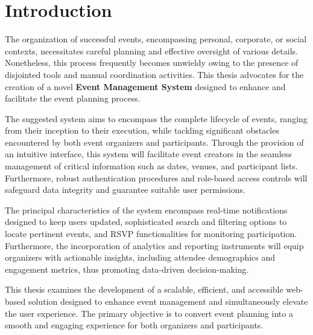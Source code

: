 \chapter{Introduction}
\label{ch:intro}

The organization of successful events, encompassing personal, corporate, or social contexts, necessitates careful planning and effective oversight of various details. Nonetheless, this process frequently becomes unwieldy owing to the presence of disjointed tools and manual coordination activities. This thesis advocates for the creation of a novel \textbf{Event Management System} designed to enhance and facilitate the event planning process.

The suggested system aims to encompass the complete lifecycle of events, ranging from their inception to their execution, while tackling significant obstacles encountered by both event organizers and participants. Through the provision of an intuitive interface, this system will facilitate event creators in the seamless management of critical information such as dates, venues, and participant lists. Furthermore, robust authentication procedures and role-based access controls will safeguard data integrity and guarantee suitable user permissions.

The principal characteristics of the system encompass real-time notifications designed to keep users updated, sophisticated search and filtering options to locate pertinent events, and RSVP functionalities for monitoring participation. Furthermore, the incorporation of analytics and reporting instruments will equip organizers with actionable insights, including attendee demographics and engagement metrics, thus promoting data-driven decision-making.

This thesis examines the development of a scalable, efficient, and accessible web-based solution designed to enhance event management and simultaneously elevate the user experience. The primary objective is to convert event planning into a smooth and engaging experience for both organizers and participants.